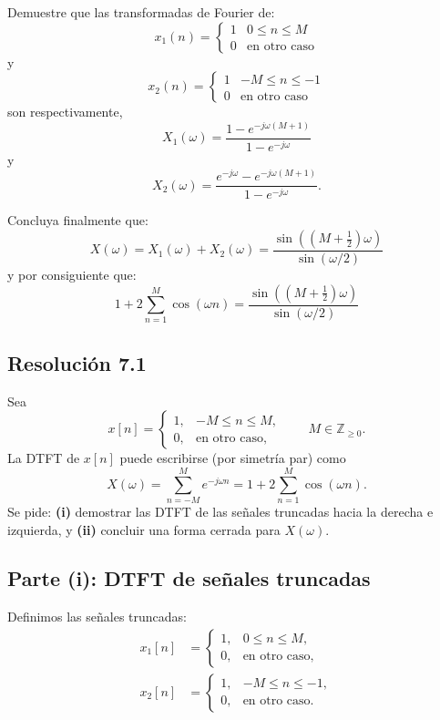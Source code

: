 \documentclass[
  11pt,
  letterpaper,
   addpoints,
   answers
  ]{exam}
\begin{document}
\begin{questions}
Demuestre que las transformadas de Fourier de:
\[
x_1(n) = \begin{cases}
1 & 0 \leq n \leq M \\
0 & \text{en otro caso}
\end{cases}
\]
y
\[
x_2(n) = \begin{cases}
1 & -M \leq n \leq -1 \\
0 & \text{en otro caso}
\end{cases}
\]
son respectivamente,
\[
X_1(\omega) = \frac{1 - e^{-j\omega(M+1)}}{1 - e^{-j\omega}}
\]
y
\[
X_2(\omega) = \frac{e^{-j\omega} - e^{-j\omega(M+1)}}{1 - e^{-j\omega}}.
\]

Concluya finalmente que:
\[
X(\omega) = X_1(\omega) + X_2(\omega) = \frac{\sin\left((M+\frac{1}{2})\omega\right)}{\sin(\omega/2)}
\]
y por consiguiente que:
\[
1 + 2\sum_{n=1}^{M} \cos(\omega n) = \frac{\sin\left((M+\frac{1}{2})\omega\right)}{\sin(\omega/2)}
\]

\begin{solution}

\subsection*{Resolución 7.1}

Sea
\[
x[n]=
\begin{cases}
1, & -M\le n\le M,\\
0, & \text{en otro caso},
\end{cases}
\qquad M\in\mathbb{Z}_{\ge 0}.
\]
La DTFT de $x[n]$ puede escribirse (por simetría par) como
\[
X(\omega)=\sum_{n=-M}^{M}e^{-j\omega n}=1+2\sum_{n=1}^{M}\cos(\omega n).
\]
Se pide: \textbf{(i)} demostrar las DTFT de las señales truncadas hacia la derecha e izquierda, y \textbf{(ii)} concluir una forma cerrada para $X(\omega)$.

\subsection*{Parte (i): DTFT de señales truncadas}

Definimos las señales truncadas:
\begin{align}
x_1[n] &= \begin{cases}
1, & 0 \leq n \leq M, \\
0, & \text{en otro caso},
\end{cases} \\
x_2[n] &= \begin{cases}
1, & -M \leq n \leq -1, \\
0, & \text{en otro caso}.
\end{cases}
\end{align}


\end{solution}
\end{questions}
\end{document}
